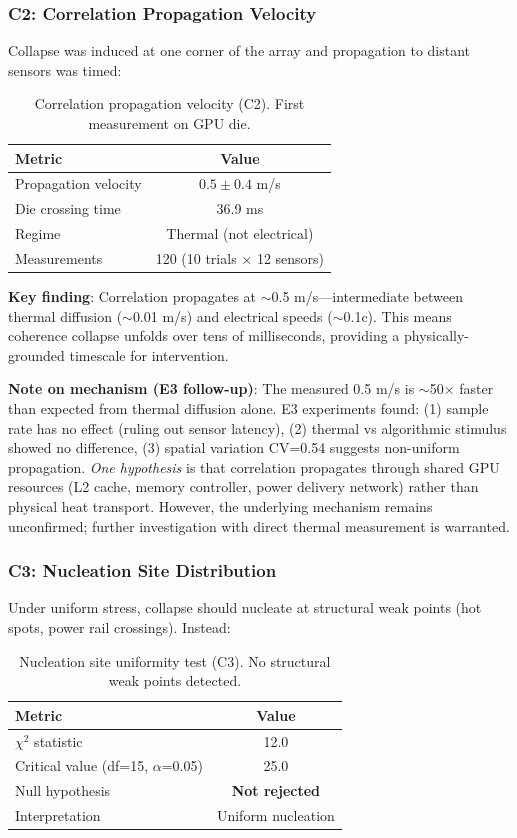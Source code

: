 \documentclass[11pt,a4paper]{article}
\theoremstyle{definition}
\theoremstyle{remark}
\begin{document}
\subsubsection{C2: Correlation Propagation Velocity}

Collapse was induced at one corner of the array and propagation to distant sensors was timed:

\begin{table}[H]
\centering
\begin{tabular}{lc}
\toprule
\textbf{Metric} & \textbf{Value} \\
\midrule
Propagation velocity & $0.5 \pm 0.4$ m/s \\
Die crossing time & 36.9 ms \\
Regime & Thermal (not electrical) \\
Measurements & 120 (10 trials $\times$ 12 sensors) \\
\bottomrule
\end{tabular}
\caption{Correlation propagation velocity (C2). First measurement on GPU die.}
\end{table}

\textbf{Key finding}: Correlation propagates at $\sim$0.5 m/s---intermediate between thermal diffusion ($\sim$0.01 m/s) and electrical speeds ($\sim$0.1c). This means coherence collapse unfolds over tens of milliseconds, providing a physically-grounded timescale for intervention.

\textbf{Note on mechanism (E3 follow-up)}: The measured 0.5 m/s is $\sim$50$\times$ faster than expected from thermal diffusion alone. E3 experiments found: (1) sample rate has no effect (ruling out sensor latency), (2) thermal vs algorithmic stimulus showed no difference, (3) spatial variation CV=0.54 suggests non-uniform propagation. \textit{One hypothesis} is that correlation propagates through shared GPU resources (L2 cache, memory controller, power delivery network) rather than physical heat transport. However, the underlying mechanism remains unconfirmed; further investigation with direct thermal measurement is warranted.

\subsubsection{C3: Nucleation Site Distribution}

Under uniform stress, collapse should nucleate at structural weak points (hot spots, power rail crossings). Instead:

\begin{table}[H]
\centering
\begin{tabular}{lc}
\toprule
\textbf{Metric} & \textbf{Value} \\
\midrule
$\chi^2$ statistic & 12.0 \\
Critical value (df=15, $\alpha$=0.05) & 25.0 \\
Null hypothesis & \textbf{Not rejected} \\
Interpretation & Uniform nucleation \\
\bottomrule
\end{tabular}
\caption{Nucleation site uniformity test (C3). No structural weak points detected.}
\end{table}
\end{document}
